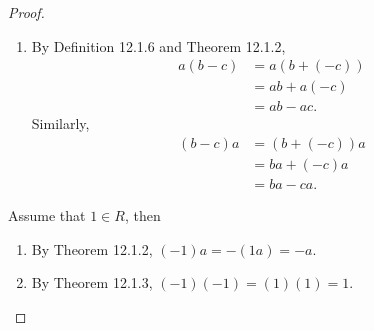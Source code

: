 \documentclass{article}
\newtheorem{theorem}{Theorem}[section]
\theoremstyle{definition}
\begin{document}
\begin{proof}
\begin{enumerate}
            \item By Definition 12.1.6 and Theorem 12.1.2,
            \begin{align*}
                a(b-c)&=a(b+(-c)) \\
                &= ab+a(-c)\\
                &= ab-ac.
            \end{align*}
            Similarly,
            \begin{align*}
                (b-c)a&=(b+(-c))a\\
                &=ba+(-c)a\\
                &=ba-ca.
            \end{align*}
        \end{enumerate}
        
        Assume that $1\in R$, then
        \begin{enumerate}[resume]
            \item By Theorem 12.1.2, $(-1)a=-(1a)=-a$.
            
            \item By Theorem 12.1.3, $(-1)(-1)=(1)(1)=1$.
        \end{enumerate}
    \end{proof}
    
    \noindent{}
\end{document}
